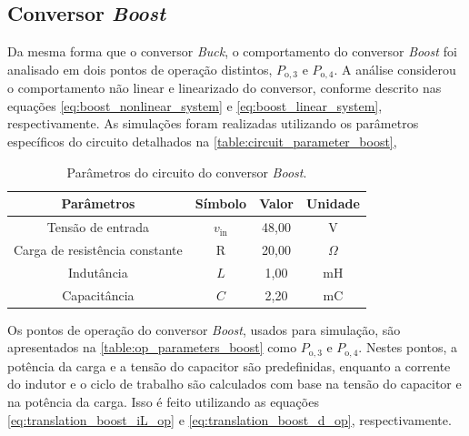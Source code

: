 \subsection{Conversor \textit{Boost}}

Da mesma forma que o conversor \textit{Buck}, o comportamento do conversor \textit{Boost} foi analisado em dois pontos de operação distintos, $P_{\mathrm{o}, 3}$ e $P_{\mathrm{o}, 4}$. A análise considerou o comportamento não linear e linearizado do conversor, conforme descrito nas equações \eqref{eq:boost_nonlinear_system} e \eqref{eq:boost_linear_system}, respectivamente. As simulações foram realizadas utilizando os parâmetros específicos do circuito detalhados na \autoref{table:circuit_parameter_boost},

\vspace{8pt}
\begin{table}[H]
  \centering
  \begin{tabular}{cccc}
    \toprule
    Parâmetros & Símbolo  & Valor & Unidade \\
    \midrule
    Tensão de entrada & $v_{\mathrm{in}}$ & 48,00 & V \\
    Carga de resistência constante & R & 20,00 & $\Omega$ \\
    Indutância & $L$ & 1,00 & mH \\
    Capacitância  & $C$ & 2,20 & mC \\
    \bottomrule
  \end{tabular}
  \caption{Parâmetros do circuito do conversor \textit{Boost}.}
  \label{table:circuit_parameter_boost}
\end{table}

Os pontos de operação do conversor \textit{Boost}, usados para simulação, são apresentados na \autoref{table:op_parameters_boost} como $P_{\mathrm{o}, 3}$ e $P_{\mathrm{o}, 4}$. Nestes pontos, a potência da carga e a tensão do capacitor são predefinidas, enquanto a corrente do indutor e o ciclo de trabalho são calculados com base na tensão do capacitor e na potência da carga. Isso é feito utilizando as equações \eqref{eq:translation_boost_iL_op} e \eqref{eq:translation_boost_d_op}, respectivamente.

